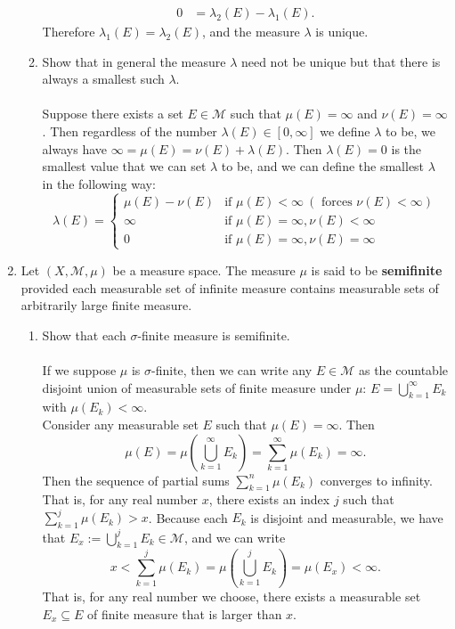 \begin{enumerate}
\begin{enumerate}[label=(\roman*),align=left]
\begin{align*}
			0&=\lambda_2(E)-\lambda_1(E).
		\end{align*}
		Therefore $\lambda_1(E)=\lambda_2(E)$, and the measure $\lambda$ is unique.
		\item Show that in general the measure $\lambda$ need not be unique but that there is always a smallest such $\lambda$.\\
		\\Suppose there exists a set $E\in\mathcal{M}$ such that $\mu(E)=\infty$ and $\nu(E)=\infty$. 
		Then regardless of the number $\lambda(E)\in[0,\infty]$ we define $\lambda$ to be, we always have $\infty=\mu(E)=\nu(E)+\lambda(E)$.
		Then $\lambda(E)=0$ is the smallest value that we can set $\lambda$ to be, and we can define the smallest $\lambda$ in the following way:
		\[
		\lambda(E)=
		\begin{cases}
			\mu(E)-\nu(E)&\text{if }\mu(E)<\infty\ (\text{ forces }\nu(E)<\infty)\\
			\infty&\text{if }\mu(E)=\infty,\nu(E)<\infty\\
			0&\text{if }\mu(E)=\infty,\nu(E)=\infty
		\end{cases}
		\]
	\end{enumerate}
	\item Let $(X,\mathcal{M},\mu)$ be a measure space.
	The measure $\mu$ is said to be \textbf{semifinite} provided each measurable set of infinite measure contains measurable sets of arbitrarily large finite measure.
	\begin{enumerate}[label=(\roman*),align=left]  
		\item Show that each $\sigma$-finite measure is semifinite.\\
		\\If we suppose $\mu$ is $\sigma$-finite, then we can write any $E\in\mathcal{M}$ as the countable disjoint union of measurable sets of finite measure under $\mu$:
		$E=\bigcup_{k=1}^\infty E_k$ with $\mu(E_k)<\infty$.
		\\Consider any measurable set $E$ such that $\mu(E)=\infty$.
		Then 
		\[
			\mu(E)=\mu(\bigcup_{k=1}^\infty E_k)=\sum_{k=1}^\infty \mu(E_k)=\infty.
		\]
		Then the sequence of partial sums $\sum_{k=1}^n \mu(E_k)$ converges to infinity.
		That is, for any real number $x$, there exists an index $j$ such that $\sum_{k=1}^j \mu(E_k)>x$.
		Because each $E_k$ is disjoint and measurable, we have that $E_x:=\bigcup_{k=1}^j E_k\in\mathcal{M}$, and we can write
		\[
			x<\sum_{k=1}^j \mu(E_k)=\mu(\bigcup_{k=1}^j E_k)=\mu(E_x)<\infty.
		\]
		That is, for any real number we choose, there exists a measurable set $E_x\subseteq E$ of finite measure that is larger than $x$.

\end{enumerate}
\end{enumerate}

